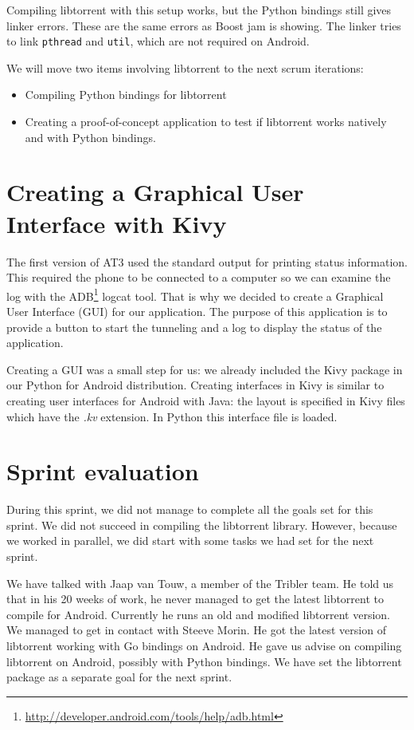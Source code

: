 		Compiling libtorrent with this setup works, but the Python bindings still gives linker errors. These are the same errors as Boost jam is showing. The linker tries to link \texttt{pthread} and \texttt{util}, which are not required on Android.
		
		We will move two items involving libtorrent to the next scrum iterations:
		\begin{itemize}
		\item Compiling Python bindings for libtorrent
		\item Creating a proof-of-concept application to test if libtorrent works natively and with Python bindings.
		\end{itemize}
	
	\section{Creating a Graphical User Interface with Kivy}
		The first version of AT3 used the standard output for printing status information. This required the phone to be connected to a computer so we can examine the log with the ADB\footnote{\url{http://developer.android.com/tools/help/adb.html}} logcat tool. That is why we decided to create a Graphical User Interface (GUI) for our application. The purpose of this application is to provide a button to start the tunneling and a log to display the status of the application.
	
		Creating a GUI was a small step for us: we already included the Kivy package in our Python for Android distribution. Creating interfaces in Kivy is similar to creating user interfaces for Android with Java: the layout is specified in Kivy files which have the \emph{.kv} extension. In Python this interface file is loaded.
	
	\section{Sprint evaluation}
		During this sprint, we did not manage to complete all the goals set for this sprint. We did not succeed in compiling the libtorrent library. However, because we worked in parallel, we did start with some tasks we had set for the next sprint.
		
		We have talked with Jaap van Touw, a member of the Tribler team. He told us that in his 20 weeks of work, he never managed to get the latest libtorrent to compile for Android.
		Currently he runs an old and modified libtorrent version. We managed to get in contact with Steeve Morin. He got the latest version of libtorrent working with Go bindings on Android. He gave us advise on compiling libtorrent on Android, possibly with Python bindings. We have set the libtorrent package as a separate goal for the next sprint.
